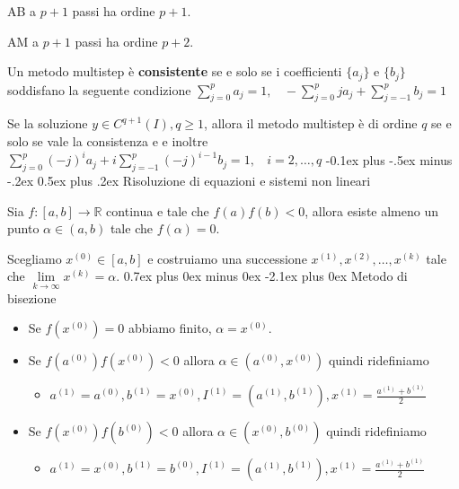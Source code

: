 \documentclass[8pt,a4paper]{article}
\makeatletter
\renewcommand{\section}{\@startsection{section}{1}{0mm}%
                                {-0.1ex plus -.5ex minus -.2ex}%
                                {0.5ex plus .2ex}%
                                {\normalfont\large\bfseries}}
\renewcommand{\subsection}{\@startsection{subsection}{2}{0mm}%
                                {0.7ex plus 0ex minus 0ex}%
                                {-2.1ex plus 0ex}%
                                {\normalfont\scriptsize\bfseries}}
\makeatother
\begin{document}
\begin{multicols}{2}
AB a $p+1$ passi ha ordine $p+1$.

AM a $p+1$ passi ha ordine $p+2$.

Un metodo multistep è \textbf{consistente} se e solo se i coefficienti $\{a_{j}\}$ e $\{b_{j}\}$ soddisfano la seguente condizione $\boxed{\sum\nolimits ^{p}_{j=0} a_{j} =1,\ \ \ \ -\sum\nolimits ^{p}_{j=0} ja_{j} +\sum\nolimits ^{p}_{j=-1} b_{j} =1}$

Se la soluzione $y\in C^{q+1}( I) ,q\geqslant 1$, allora il metodo multistep è di ordine $q$ se e solo se vale la consistenza e e inoltre $\boxed{\sum\nolimits ^{p}_{j=0}( -j)^{i} a_{j} +i\sum\nolimits ^{p}_{j=-1}( -j)^{i-1} b_{j} =1,\ \ \ \ i=2,\dotsc ,q}$
\section{Risoluzione di equazioni e sistemi non lineari}

Sia $f:[ a,b]\rightarrow \mathbb{R}$ continua e tale che $f( a) f( b) < 0$, allora esiste almeno un punto $\alpha \in ( a,b)$ tale che $f( \alpha ) =0$.

Scegliamo $x^{( 0)} \in [ a,b]$ e costruiamo una successione $x^{( 1)} ,x^{( 2)} ,\dotsc ,x^{( k)}$ tale che $\lim\limits _{k\rightarrow \infty } x^{( k)} =\alpha $.
\subsection{Metodo di bisezione}
\begin{itemize}
\item Se $f\left( x^{( 0)}\right) =0$ abbiamo finito, $\alpha =x^{( 0)}$.
\item Se $f\left( a^{( 0)}\right) f\left( x^{( 0)}\right) < 0$ allora $\alpha \in \left( a^{( 0)} ,x^{( 0)}\right)$ quindi ridefiniamo
\begin{itemize}
\item $a^{( 1)} =a^{( 0)} ,b^{( 1)} =x^{( 0)} ,I^{( 1)} =\left( a^{( 1)} ,b^{( 1)}\right) ,x^{( 1)} =\frac{a^{( 1)} +b^{( 1)}}{2}$
\end{itemize}
\item Se $f\left( x^{( 0)}\right) f\left( b^{( 0)}\right) < 0$ allora $\alpha \in \left( x^{( 0)} ,b^{( 0)}\right)$ quindi ridefiniamo
\begin{itemize}
\item $a^{( 1)} =x^{( 0)} ,b^{( 1)} =b^{( 0)} ,I^{( 1)} =\left( a^{( 1)} ,b^{( 1)}\right) ,x^{( 1)} =\frac{a^{( 1)} +b^{( 1)}}{2}$
\end{itemize}
\end{itemize}


\end{multicols}
\end{document}
